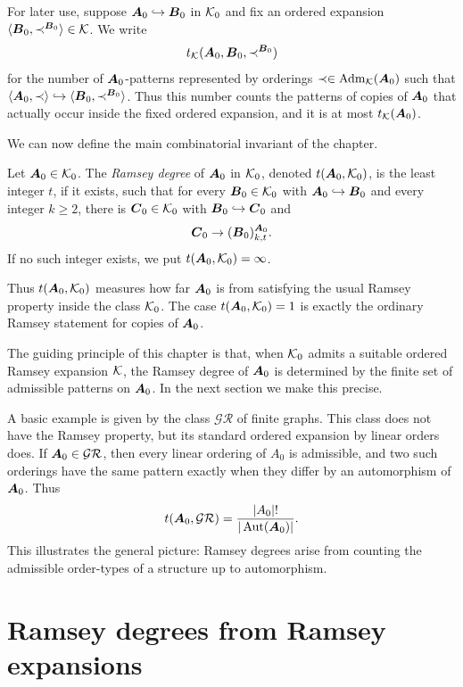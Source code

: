 For later use, suppose \(\boldsymbol{A}_0\hookrightarrow\boldsymbol{B}_0\) in \(\mathcal{K}_0\) and fix an
ordered expansion \(\langle \boldsymbol{B}_0,\prec^{\boldsymbol{B}_0}\rangle\in\mathcal{K}\). We write
\[
    t_{\mathcal{K}}(\boldsymbol{A}_0,\boldsymbol{B}_0,\prec^{\boldsymbol{B}_0})
\]
for the number of \(\boldsymbol{A}_0\)-patterns represented by orderings
\(\prec\in\operatorname{Adm}_{\mathcal{K}}(\boldsymbol{A}_0)\) such that
\(\langle \boldsymbol{A}_0,\prec\rangle\hookrightarrow
\langle \boldsymbol{B}_0,\prec^{\boldsymbol{B}_0}\rangle\).
Thus this number counts the patterns of copies of \(\boldsymbol{A}_0\) that actually occur
inside the fixed ordered expansion, and it is at most \(t_{\mathcal{K}}(\boldsymbol{A}_0)\).

We can now define the main combinatorial invariant of the chapter.

\begin{definition}
    Let \(\boldsymbol{A}_0\in\mathcal{K}_0\). The \emph{Ramsey degree} of \(\boldsymbol{A}_0\) in \(\mathcal{K}_0\),
    denoted \(t(\boldsymbol{A}_0,\mathcal{K}_0)\), is the least integer \(t\), if it exists, such
    that for every \(\boldsymbol{B}_0\in\mathcal{K}_0\) with
    \(\boldsymbol{A}_0\hookrightarrow\boldsymbol{B}_0\) and every integer \(k\geq 2\), there is
    \(\boldsymbol{C}_0\in\mathcal{K}_0\) with \(\boldsymbol{B}_0\hookrightarrow\boldsymbol{C}_0\) and
    \[
        \boldsymbol{C}_0\to(\boldsymbol{B}_0)^{\boldsymbol{A}_0}_{k,t}.
    \]
    If no such integer exists, we put \(t(\boldsymbol{A}_0,\mathcal{K}_0)=\infty\).
\end{definition}

Thus \(t(\boldsymbol{A}_0,\mathcal{K}_0)\) measures how far \(\boldsymbol{A}_0\) is from satisfying the usual Ramsey property inside the class \(\mathcal{K}_0\). The case \(t(\boldsymbol{A}_0,\mathcal{K}_0)=1\) is exactly the ordinary Ramsey statement for copies of \(\boldsymbol{A}_0\).

The guiding principle of this chapter is that, when \(\mathcal{K}_0\) admits a suitable ordered Ramsey expansion \(\mathcal{K}\), the Ramsey degree of \(\boldsymbol{A}_0\) is determined by the finite set of admissible patterns on \(\boldsymbol{A}_0\). In the next section we make this precise.

A basic example is given by the class \(\mathcal{GR}\) of finite graphs. This class does not have the Ramsey property, but its standard ordered expansion by linear orders does. If \(\boldsymbol{A}_0\in\mathcal{GR}\), then every linear ordering of \(A_0\) is admissible, and two such orderings have the same pattern exactly when they differ by an automorphism of \(\boldsymbol{A}_0\). Thus
\[
    t(\boldsymbol{A}_0,\mathcal{GR})
    =
    \frac{|A_0|!}{|\operatorname{Aut}(\boldsymbol{A}_0)|}.
\]
This illustrates the general picture: Ramsey degrees arise from counting the admissible order-types of a structure up to automorphism.

\section{Ramsey degrees from Ramsey expansions}


